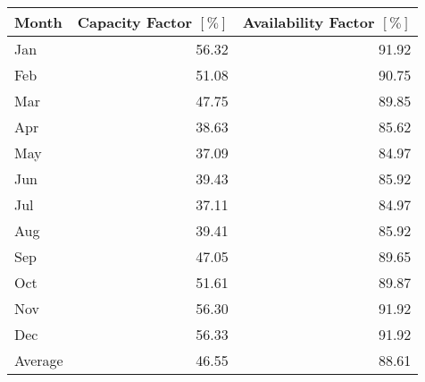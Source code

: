 \begin{tabular}{lrr}
\toprule
   Month &  Capacity Factor $[\%]$ &  Availability Factor $[\%]$ \\
\midrule
     Jan &                   56.32 &                       91.92 \\
     Feb &                   51.08 &                       90.75 \\
     Mar &                   47.75 &                       89.85 \\
     Apr &                   38.63 &                       85.62 \\
     May &                   37.09 &                       84.97 \\
     Jun &                   39.43 &                       85.92 \\
     Jul &                   37.11 &                       84.97 \\
     Aug &                   39.41 &                       85.92 \\
     Sep &                   47.05 &                       89.65 \\
     Oct &                   51.61 &                       89.87 \\
     Nov &                   56.30 &                       91.92 \\
     Dec &                   56.33 &                       91.92 \\
 Average &                   46.55 &                       88.61 \\
\bottomrule
\end{tabular}
